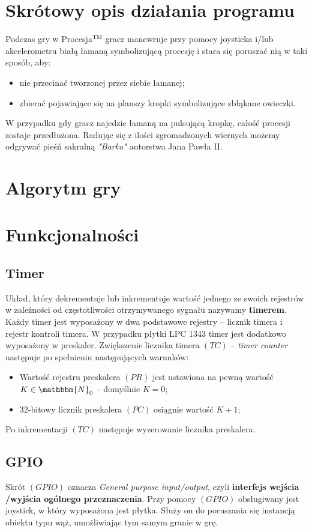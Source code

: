 \documentclass[a4paper,12pt,twoside]{article}
\newcommand{\N}{\mathbbm{N}}
\theoremstyle{plain}
\theoremstyle{definition}
\theoremstyle{remark}
\begin{document}
\section{Skrótowy opis działania programu}
Podczas gry w Procesja$^{\textrm{TM}}$ gracz manewruje przy pomocy joysticka i/lub akcelerometru białą łamaną symbolizującą procesję i stara się poruszać nią w taki sposób, aby:
\begin{itemize}
	\item nie przecinać tworzonej przez siebie łamanej; 
	\item zbierać pojawiające się na planszy kropki symbolizujące zbłąkane owieczki.
\end{itemize}

W przypadku gdy gracz najedzie łamaną na pulsującą kropkę, całość procesji zostaje przedłużona. Radując się z ilości zgromadzonych wiernych możemy odgrywać pieśń sakralną \textit{"Barka"} autorstwa Jana Pawła II.

\section{Algorytm gry}

\section{Funkcjonalności}
\subsection{Timer}
Układ, który dekrementuje lub inkrementuje wartość jednego ze swoich rejestrów w zależności od częstotliwości otrzymywanego sygnału nazywamy \textbf{timerem}. Każdy timer jest wyposażony w dwa podstawowe rejestry -- licznik timera i rejestr kontroli timera. W przypadku płytki LPC 1343 timer jest dodatkowo wyposażony w preskaler. Zwiększenie licznika timera $(TC)$ -- \textit{timer counter} następuje po spełnieniu następujących warunków:
\begin{itemize}
\item Wartość rejestru preskalera $(PR)$ jest ustawiona na pewną wartość $K\in \N_0$ -- domyślnie $K=0$;
\item 32-bitowy licznik preskalera $(PC)$ osiągnie wartość $K+1$;
\end{itemize}
Po inkrementacji $(TC)$ następuje wyzerowanie licznika preskalera.
\subsection{GPIO}
Skrót $(GPIO)$ oznacza \textit{General purpose input/output}, czyli \textbf{interfejs wejścia /wyjścia ogólnego przeznaczenia}. Przy pomocy $(GPIO)$ obsługiwany jest joystick, w który wyposażona jest płytka. Służy on do poruszania się instancją obiektu typu wąż, umożliwiając tym samym granie w grę.
\end{document}
